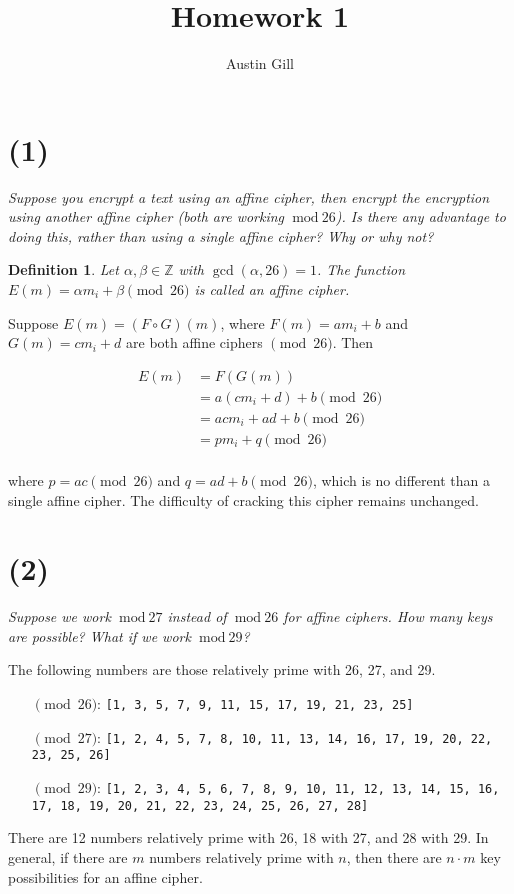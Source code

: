 \documentclass[12pt]{article}
\title{Homework 1}
\author{Austin Gill}
\renewcommand{\mod}[1]{\ \mathrm{mod}\ #1}
\newtheorem*{defn}{Definition}
\begin{document}
\maketitle

\section*{(1)} \textit{Suppose you encrypt a text using an affine cipher, then encrypt the encryption using another affine cipher (both are working $\mod{26}$). Is there any advantage to doing this, rather than using a single affine cipher? Why or why not?}

\begin{defn}
Let $\alpha , \beta \in \mathbb Z$ with $\gcd(\alpha , 26) = 1$. The function $E(m) = \alpha m_i + \beta \pmod{26}$ is called an affine cipher.
\end{defn}

Suppose $E(m) = (F \circ G)(m)$, where $F(m) = am_i + b$ and $G(m) = cm_i + d$ are both affine ciphers $\pmod{26}$. Then

\begin{align*}
    E(m) &= F(G(m))\\
         &= a(cm_i + d) + b \pmod{26}\\
         &= acm_i + ad + b \pmod{26}\\
         &= pm_i + q \pmod{26}\\
\end{align*}

where $p = ac \pmod{26}$ and $q = ad + b \pmod{26}$, which is no different than a single affine cipher. The difficulty of cracking this cipher remains unchanged.

\section*{(2)} \textit{Suppose we work $\mod{27}$ instead of $\mod{26}$ for affine ciphers. How many keys are possible? What if we work $\mod{29}$?}

The following numbers are those relatively prime with 26, 27, and 29.
\begin{itemize}
  \item[$\pmod{26}$:]
  \texttt{[1, 3, 5, 7, 9, 11, 15, 17, 19, 21, 23, 25]}
  \item[$\pmod{27}$:]
  \texttt{[1, 2, 4, 5, 7, 8, 10, 11, 13, 14, 16, 17, 19, 20, 22, 23, 25, 26]}
  \item[$\pmod{29}$:]
  \texttt{[1, 2, 3, 4, 5, 6, 7, 8, 9, 10, 11, 12, 13, 14, 15, 16, 17, 18, 19, 20, 21, 22, 23, 24, 25, 26, 27, 28]}
\end{itemize}
There are 12 numbers relatively prime with 26, 18 with 27, and 28 with 29. In general, if there are $m$ numbers relatively prime with $n$, then there are $n\cdot m$ key possibilities for an affine cipher.
\end{document}
